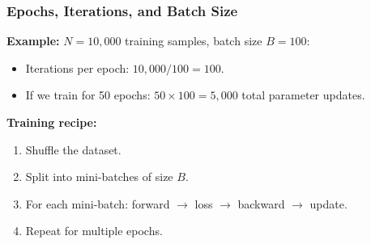 \documentclass[notes,11pt, aspectratio=169]{beamer}
\begin{document}
\begin{frame}
\frametitle{Epochs, Iterations, and Batch Size}


\vspace{8pt}
\textbf{Example:} $N = 10{,}000$ training samples, batch size $B = 100$:
\begin{itemize}
    \item Iterations per epoch: $10{,}000 / 100 = 100$.
    \item If we train for 50 epochs: $50 \times 100 = 5{,}000$ total parameter updates.
\end{itemize}

\vspace{8pt}
\textbf{Training recipe:}
\begin{enumerate}
    \item Shuffle the dataset.
    \item Split into mini-batches of size $B$.
    \item For each mini-batch: forward $\to$ loss $\to$ backward $\to$ update.
    \item Repeat for multiple epochs.
\end{enumerate}
\end{frame}
\end{document}
